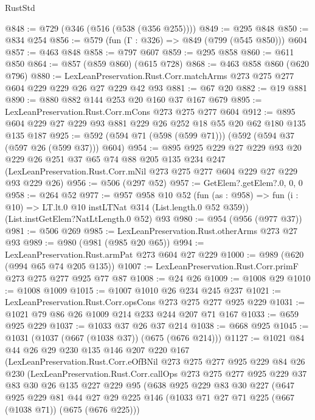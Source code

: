 \begin{lexlean}{RustStd}
\begin{coremodule}
@848 := @729 (@346 (@516 (@538 (@356 @255))))
@849 := @295 @848
@850 := @834 @254
@856 := @579 (fun (Γ : @326) => @849 (@799 (@545 @850))) @604
@857 := @463 @848
@858 := @797 @607
@859 := @295 @858
@860 := @611 @850
@864 := @857 (@859 @860) (@615 @728)
@868 := @463 @858 @860 (@620 @796)
@880 := LexLeanPreservation.Rust.Corr.matchArms @273 @275 @277 @604 @229 @229 @26 @27 @229 @42 @93
@881 := @67 @20
@882 := @19 @881
@890 := @880 @882 @144 @253 @20 @160 @37 @167 @679
@895 := LexLeanPreservation.Rust.Corr.mCons @273 @275 @277 @604
@912 := @895 @604 @229 @27 @229 @93 @881 @229 @26 @252 @18 @55 @20 @62 @180 @135 @135 @187
@925 := @592 (@594 @71 (@598 (@599 @71))) (@592 (@594 @37 (@597 @26 (@599 @37))) @604)
@954 := @895
    @925
    @229
    @27
    @229
    @93
    @20
    @229
    @26
    @251
    @37
    @65
    @74
    @88
    @205
    @135
    @234
    @247
    (LexLeanPreservation.Rust.Corr.mNil @273 @275 @277 @604 @229 @27 @229 @93 @229 @26)
@956 := @506 (@297 @52)
@957 := GetElem?.getElem?.{0, 0, 0}
@958 := @264 @52
@977 := @957
    @958
    @10
    @52
    (fun (as : @958) => fun (i : @10) => LT.lt.{0} @10 instLTNat @314 (List.length.{0} @52 @359))
    (List.instGetElem?NatLtLength.{0} @52)
    @93
@980 := @954 (@956 (@977 @37))
@981 := @506 @269
@985 := LexLeanPreservation.Rust.otherArms @273 @27 @93
@989 := @980 (@981 (@985 @20 @65))
@994 := LexLeanPreservation.Rust.armPat @273 @604 @27 @229
@1000 := @989 (@620 (@994 @65 @74 @205 @135))
@1007 := LexLeanPreservation.Rust.Corr.primF @273 @275 @277 @925 @77 @87
@1008 := @24 @26
@1009 := @1008 @29
@1010 := @1008 @1009
@1015 := @1007 @1010 @26 @234 @245 @237
@1021 := LexLeanPreservation.Rust.Corr.opsCons @273 @275 @277 @925 @229
@1031 := @1021 @79 @86 @26 @1009 @214 @233 @244 @207 @71 @167
@1033 := @659 @925 @229
@1037 := @1033 @37 @26 @37 @214
@1038 := @668 @925
@1045 := @1031 (@1037 (@667 (@1038 @37)) (@675 (@676 @214)))
@1127 := @1021
    @84
    @44
    @26
    @29
    @230
    @135
    @146
    @207
    @220
    @167
    (LexLeanPreservation.Rust.Corr.eOfBNil
      @273
      @275
      @277
      @925
      @229
      @84
      @26
      @230
      (LexLeanPreservation.Rust.Corr.callOps
        @273
        @275
        @277
        @925
        @229
        @37
        @83
        @30
        @26
        @135
        @227
        @229
        @95
        (@638
          @925
          @229
          @83
          @30
          @227
          (@647
            @925
            @229
            @81
            @44
            @27
            @29
            @225
            @146
            (@1033 @71 @27 @71 @225 (@667 (@1038 @71)) (@675 (@676 @225)))

\end{coremodule}
\end{lexlean}
